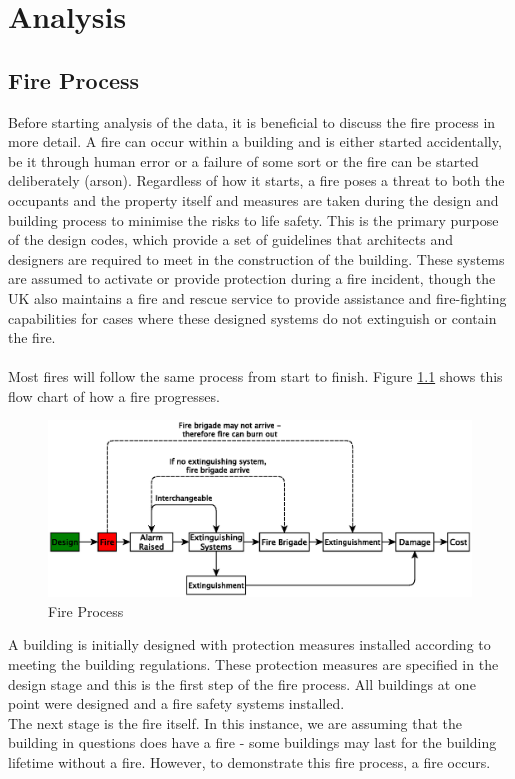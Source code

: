 \documentclass[a4paper,oneside]{book}
\begin{document}
\chapter{Analysis}
\section{Fire Process}
Before starting analysis of the data, it is beneficial to discuss the fire process in more detail. A fire can occur within a building and is either started accidentally, be it through human error or a failure of some sort or the fire can be started deliberately (arson). Regardless of how it starts, a fire poses a threat to both the occupants and the property itself and measures are taken during the design and building process to minimise the risks to life safety.  This is the primary purpose of the design codes, which provide a set of guidelines that architects and designers are required to meet in the construction of the building. These systems are assumed to activate or provide protection during a fire incident, though the UK also maintains a fire and rescue service to provide assistance and fire-fighting capabilities for cases where these designed systems do not extinguish or contain the fire.
\\
\\
Most fires will follow the same process from start to finish. Figure \ref{fig:Fire_Process} shows this flow chart of how a fire progresses. 

\begin{figure}[htp]
\centering
	\includegraphics[width=14cm]{11-06-07_Fire_Process}
	\caption{Fire Process}
	\label{fig:Fire_Process}
\end{figure}

A building is initially designed with protection measures installed according to meeting the building regulations. These protection measures are specified in the design stage and this is the first step of the fire process. All buildings at one point were designed and a fire safety systems installed.
\\
The next stage is the fire itself. In this instance, we are assuming that the building in questions does have a fire - some buildings may last for the building lifetime without a fire. However, to demonstrate this fire process, a fire occurs.
\\
\\
\end{document}
